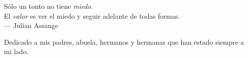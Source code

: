 
\thispagestyle{empty}


\vspace*{3cm}

\begin{center}
Sólo un tonto no tiene \emph{miedo}. \\
El \emph{valor} es ver el miedo y seguir adelante de todas formas. \\ \medskip
--- Julian Assange   
\end{center}

\medskip

\begin{center}
Dedicado a mis padres, abuela, hermanos y hermanas que han estado siempre a mi lado. \\ \smallskip
\end{center}